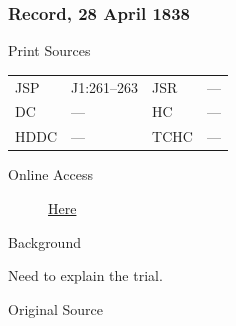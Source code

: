 		\subsubsection{Record, 28 April 1838}
			\label{EMS-1836-JS-28-APR-1838}
			
			\begin{description}
					\item[Print Sources]
				\end{description}

					\begin{tabular}{p{0.5in}p{1in}p{0.5in}p{1in}}
					JSP	 	& J1:261--263		& JSR 		& --- \\
					DC	 	& ---				& HC 		& --- \\
					HDDC 	& ---				& TCHC 		& --- \\
					\end{tabular}
				
				\begin{description}
					\item[Online Access] \href{https://www.josephsmithpapers.org/paper-summary/journal-march-september-1838/20}{Here}
				\end{description}
				
				\begin{description}
					\item[Background]
				\end{description}
				
					
					Need to explain the trial.
				
				\begin{description}
					\item[Original Source]
				\end{description}
				
					
